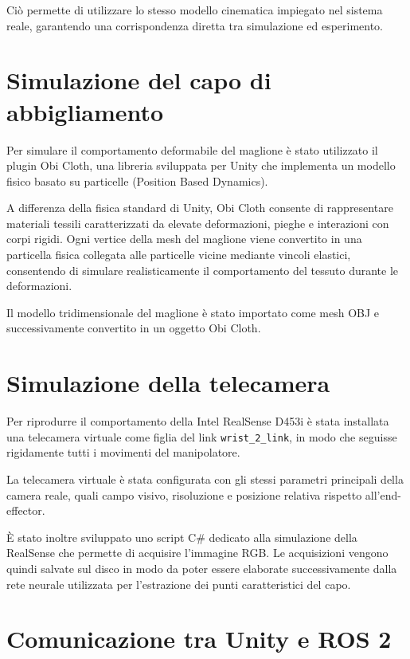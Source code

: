 Ciò permette di utilizzare lo stesso modello cinematica impiegato nel sistema reale, garantendo una corrispondenza diretta tra simulazione ed esperimento.

\section{Simulazione del capo di abbigliamento}

Per simulare il comportamento deformabile del maglione è stato utilizzato il plugin Obi Cloth, una libreria sviluppata per Unity che implementa un modello fisico basato su particelle (Position Based Dynamics).

A differenza della fisica standard di Unity, Obi Cloth consente di rappresentare materiali tessili caratterizzati da elevate deformazioni, pieghe e interazioni con corpi rigidi. Ogni vertice della mesh del maglione viene convertito in una particella fisica collegata alle particelle vicine mediante vincoli elastici, consentendo di simulare realisticamente il comportamento del tessuto durante le deformazioni.

Il modello tridimensionale del maglione è stato importato come mesh OBJ e successivamente convertito in un oggetto Obi Cloth.

\section{Simulazione della telecamera}

Per riprodurre il comportamento della Intel RealSense D453i è stata installata una telecamera virtuale come figlia del link \texttt{wrist\_2\_link}, in modo che seguisse rigidamente tutti i movimenti del manipolatore.

La telecamera virtuale è stata configurata con gli stessi parametri principali della camera reale, quali campo visivo, risoluzione e posizione relativa rispetto all'end-effector.

È stato inoltre sviluppato uno script C\# dedicato alla simulazione della RealSense che permette di acquisire l'immagine RGB. Le acquisizioni vengono quindi salvate sul disco in modo da poter essere elaborate successivamente dalla rete neurale utilizzata per l'estrazione dei punti caratteristici del capo.

\section{Comunicazione tra Unity e ROS 2}

